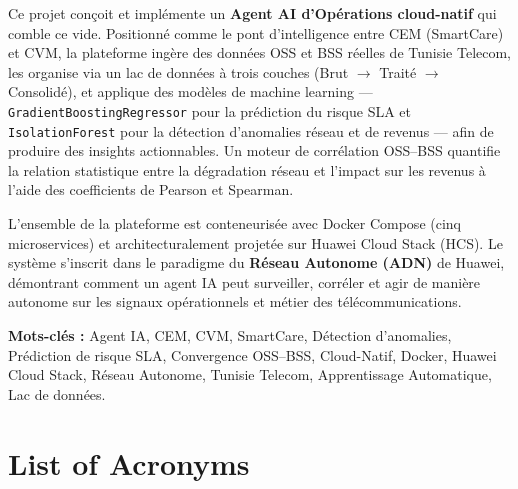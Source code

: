 Ce projet conçoit et implémente un \textbf{Agent AI d'Opérations cloud-natif} qui comble ce vide. Positionné comme le pont d'intelligence entre CEM (SmartCare) et CVM, la plateforme ingère des données OSS et BSS réelles de Tunisie Telecom, les organise via un lac de données à trois couches (Brut $\to$ Traité $\to$ Consolidé), et applique des modèles de machine learning --- \texttt{GradientBoostingRegressor} pour la prédiction du risque SLA et \texttt{IsolationForest} pour la détection d'anomalies réseau et de revenus --- afin de produire des insights actionnables. Un moteur de corrélation OSS--BSS quantifie la relation statistique entre la dégradation réseau et l'impact sur les revenus à l'aide des coefficients de Pearson et Spearman.

L'ensemble de la plateforme est conteneurisée avec Docker Compose (cinq microservices) et architecturalement projetée sur Huawei Cloud Stack (HCS). Le système s'inscrit dans le paradigme du \textbf{Réseau Autonome (ADN)} de Huawei, démontrant comment un agent IA peut surveiller, corréler et agir de manière autonome sur les signaux opérationnels et métier des télécommunications.

\vspace{0.5cm}
\noindent\textbf{Mots-clés :} Agent IA, CEM, CVM, SmartCare, Détection d'anomalies, Prédiction de risque SLA, Convergence OSS--BSS, Cloud-Natif, Docker, Huawei Cloud Stack, Réseau Autonome, Tunisie Telecom, Apprentissage Automatique, Lac de données.

\newpage

\chapter*{List of Acronyms}

